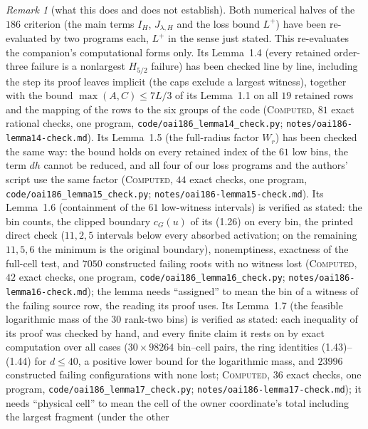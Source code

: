 \documentclass[11pt]{amsart}
\theoremstyle{definition}
\theoremstyle{remark}
\newtheorem{remark}[theorem]{Remark}
\newcommand{\lbl}[1]{\textup{\textsc{#1}}}
\begin{document}
\begin{remark}[what this does and does not establish]\label{rem:186-status}
Both numerical halves of the $186$ criterion (the main terms $I_H$,
$J_{\lambda,H}$ and the loss bound $L^+$) have been re-evaluated by two
programs each, $L^+$ in the sense just stated. This re-evaluates the
companion's computational forms only. Its Lemma~1.4 (every retained order-three
failure is a nonlargest $H_{5/2}$ failure) has been checked line by line, including
the step its proof leaves implicit (the caps exclude a largest witness), together
with the bound $\max(A,C)\le7L/3$ of its Lemma~1.1 on all $19$ retained rows and the
mapping of the rows to the six groups of the code (\lbl{Computed}, $81$ exact
rational checks, one program, \texttt{code/oai186\_lemma14\_check.py};
\texttt{notes/oai186-lemma14-check.md}). Its Lemma~1.5 (the full-radius factor $W_r$) has been checked the same way: the bound
holds on every retained index of the $61$ low bins, the term $dh$ cannot be reduced, and all four of our loss
programs and the authors' script use the same factor (\lbl{Computed}, $44$ exact checks, one program,
\texttt{code/oai186\_lemma15\_check.py}; \texttt{notes/oai186-lemma15-check.md}). Its Lemma~1.6 (containment of
the $61$ low-witness intervals) is verified as stated: the bin counts, the clipped boundary $c_G(u)$ of its (1.26) on
every bin, the printed direct check ($11,2,5$ intervals below every absorbed activation; on the remaining $11,5,6$ the
minimum is the original boundary), nonemptiness, exactness of the full-cell test, and $7050$ constructed failing roots
with no witness lost (\lbl{Computed}, $42$ exact checks, one program, \texttt{code/}\allowbreak\texttt{oai186\_lemma16\_check.py};
\texttt{notes/}\allowbreak\texttt{oai186-lemma16-check.md}); the lemma needs ``assigned'' to mean the bin of a witness of the failing source
row, the reading its proof uses. Its Lemma~1.7 (the feasible logarithmic mass of the $30$ rank-two bins) is verified as
stated: each inequality of its proof was checked by hand, and every finite claim it rests on by exact computation over all
cases ($30\times98264$ bin--cell pairs, the ring identities (1.43)--(1.44) for $d\le40$, a positive lower bound for the
logarithmic mass, and $23996$ constructed failing configurations with none lost; \lbl{Computed}, $36$ exact checks, one
program, \texttt{code/}\allowbreak\texttt{oai186\_lemma17\_check.py}; \texttt{notes/}\allowbreak\texttt{oai186-lemma17-check.md}); it needs
``physical cell'' to mean the cell of the owner coordinate's total including the largest fragment (under the other

\end{remark}
\end{document}

